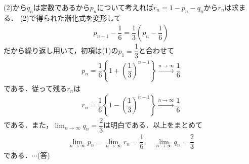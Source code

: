 \documentclass[../../main.tex]{subfiles}
\begin{document}
(2)から$q_n$は定数であるから$p_n$について考えれば$r_n=1-p_n-q_n$から$r_n$は求まる．
(2)で得られた漸化式を変形して
\begin{align}
  p_{n+1}-\dfrac{1}{6}=\dfrac{1}{3}\left(p_n-\dfrac{1}{6}\right)
\end{align}
だから繰り返し用いて，初項は(1)の$p_1=\dfrac{1}{3}$と合わせて
\begin{align}
  p_n
  =\dfrac{1}{6}\left\{1+\left(\dfrac{1}{3}\right)^{n-1}\right\}
  \xrightarrow{n\to\infty}\dfrac{1}{6}
\end{align}
である．従って残る$r_n$は
\begin{align}
  r_{n}=\dfrac{1}{6}\left\{1-\left(\dfrac{1}{3}\right)^{n-1}\right\}
  \xrightarrow{n\to\infty}\dfrac{1}{6}
\end{align}
である．また，$\lim_{n\to\infty}q_n=\dfrac{2}{3}$は明白である．以上をまとめて
\begin{align}
  \lim_{n\to\infty}p_n = \lim_{n\to\infty}r_n = \dfrac{1}{6}, \quad \lim_{n\to\infty}q_n=\dfrac{2}{3}
\end{align}
である．$\cdots$(答)
\newpage
\end{document}
